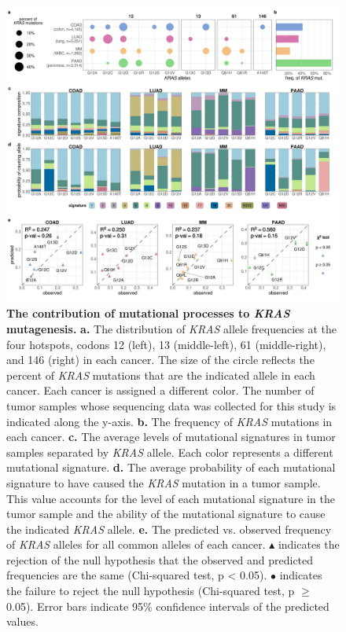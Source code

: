 \documentclass[english, 10pt, letterpaper]{article}
\newcommand{\KRAS}{\emph{KRAS}}
\begin{document}

{}

\newpage


\begin{figure}[h!]
\centering
\includegraphics[width=180mm]{figures/Fig_1.jpeg}
\caption{
    \textbf{The contribution of mutational processes to \KRAS{} mutagenesis.}
    \textbf{a.} The distribution of \KRAS{} allele frequencies at the four hotspots, codons 12 (left), 13 (middle-left), 61 (middle-right), and 146 (right) in each cancer. The size of the circle reflects the percent of \KRAS{} mutations that are the indicated allele in each cancer. Each cancer is assigned a different color. The number of tumor samples whose sequencing data was collected for this study is indicated along the y-axis. 
    \textbf{b.} The frequency of \KRAS{} mutations in each cancer.
    \textbf{c.} The average levels of mutational signatures in tumor samples separated by \KRAS{} allele. Each color represents a different mutational signature.
    \textbf{d.} The average probability of each mutational signature to have caused the \KRAS{} mutation in a tumor sample. This value accounts for the level of each mutational signature in the tumor sample and the ability of the mutational signature to cause the indicated \KRAS{} allele.
    \textbf{e.} The predicted vs. observed frequency of \KRAS{} alleles for all common alleles of each cancer. $\blacktriangle$ indicates the rejection of the null hypothesis that the observed and predicted frequencies are the same (Chi-squared test, p < 0.05). $\bullet$ indicates the failure to reject the null hypothesis (Chi-squared test, p $\ge$ 0.05). Error bars indicate 95\% confidence intervals of the predicted values.
}
\label{fig:mutational-signatures-main}
\end{figure}
\newpage
\end{document}

